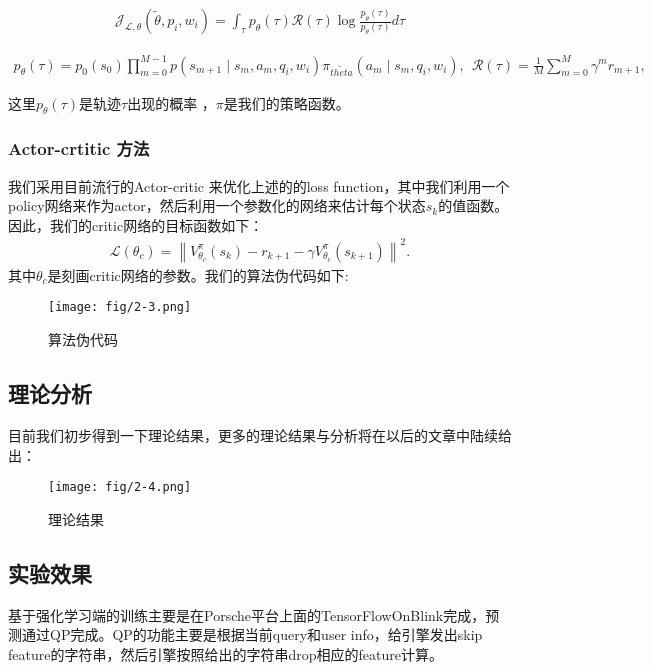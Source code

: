 \begin{align}
\mathcal{J}_{\mathcal{L}, \theta} \left(\tilde{\theta},p_i, w_i\right)=\int_{\tau} p_{\theta}(\tau) \mathcal{R}(\tau) \log \frac{p_{\tilde{\theta}}(\tau)}{p_{\theta}(\tau)} d \tau 
\end{align}

\begin{align}
p_{\theta}(\tau) = p_{0}(s_{0}) \prod_{m=0}^{M-1} p\left(s_{m+1}\mid s_{m}, a_{m},q_i,w_i\right)\pi_{\tilde{theta}} (a_{m}\mid s_{m},q_i,w_i),  \ \ \mathcal{R}(\tau) = \frac{1}{M} \sum_{m=0}^{M} \gamma^m r_{m+1},
\end{align}

这里$p_{\theta}(\tau) $是轨迹$\tau$出现的概率 ，$\pi$是我们的策略函数。


\subsubsection{Actor-crtitic 方法}
我们采用目前流行的Actor-critic 来优化上述的的loss function，其中我们利用一个policy网络来作为actor，然后利用一个参数化的网络来估计每个状态$s_k$的值函数。因此，我们的critic网络的目标函数如下：
\begin{align}
\mathcal{L}(\theta_c)=\left\lVert V^{\pi}_{\theta_c}(s_k)-r_{k+1}-\gamma V_{\theta_c}^{\pi}(s_{k+1})\right\rVert^2.
\end{align}
其中$\theta_c$是刻画critic网络的参数。我们的算法伪代码如下:
\begin{figure}[!h]
\centering
\texttt{[image: fig/2-3.png]}
\caption{算法伪代码}
\end{figure}

\subsection{理论分析}
目前我们初步得到一下理论结果，更多的理论结果与分析将在以后的文章中陆续给出：
\begin{figure}[!h]
\centering
\texttt{[image: fig/2-4.png]}
\caption{理论结果}
\end{figure}

\subsection{实验效果}
基于强化学习端的训练主要是在Porsche平台上面的TensorFlowOnBlink完成，预测通过QP完成。QP的功能主要是根据当前query和user info，给引擎发出skip feature的字符串，然后引擎按照给出的字符串drop相应的feature计算。


